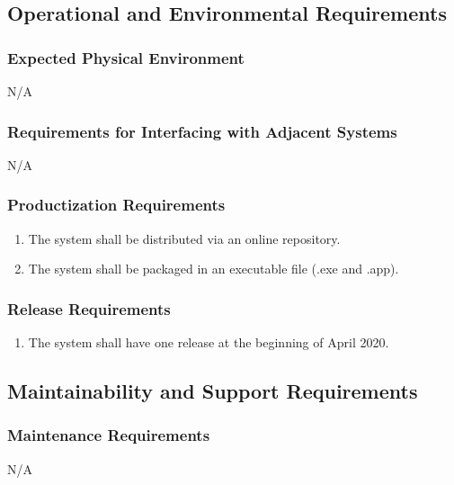 \documentclass[]{article}
\begin{document}
\subsection{Operational and Environmental Requirements}
\label{sub:operational_and_environmental_requirements}

\subsubsection{Expected Physical Environment}
\label{ssub:expected_physical_environment}
N/A

\subsubsection{Requirements for Interfacing with Adjacent Systems}
\label{ssub:requirements_for_interfacing_with_adjacent_systems}
N/A

\subsubsection{Productization Requirements}
\label{ssub:productization_requirements}
\begin{enumerate}[start=1, label={OE\arabic*.}]
    \item The system shall be distributed via an online repository. 
    \item The system shall be packaged in an executable file (.exe and .app).
\end{enumerate}

\subsubsection{Release Requirements}
\label{ssub:release_requirements}
\begin{enumerate}[start=3, label={OE\arabic*.}]
    \item The system shall have one release at the beginning of April 2020.
\end{enumerate}

\subsection{Maintainability and Support Requirements}
\label{sub:maintainability_and_support_requirements}

\subsubsection{Maintenance Requirements}
\label{ssub:maintenance_requirements}
N/A
\end{document}
